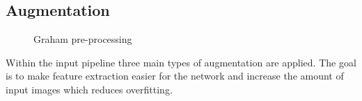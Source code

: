 \documentclass{article}
\begin{document}
\subsection{Augmentation}
\begin{figure}%
  \vspace{-10pt}
  \centering
  \hspace{0.5cm}
  \caption{Graham pre-processing}
\end{figure}
Within the input pipeline three main types of augmentation are applied.
The goal is to make feature extraction easier for the network and increase the amount of input images which reduces overfitting.
\end{document}

